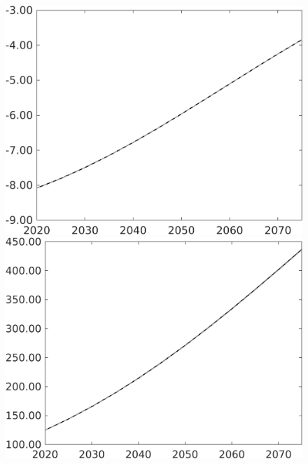 \documentclass[12pt]{article}
\begin{document}
\begin{figure}[h!!]
\begin{minipage}[]{0.32\textwidth}
\end{minipage}
\begin{minipage}[]{0.32\textwidth}
\includegraphics[width=1\textwidth]{../../codding_model/own_basedOnFried/optimalPol_010922_revision/figures/all_13Sept22/PerdifNoTauf_Equlab_regime0_CompTaul_N_spillover0_nsk0_xgr1_knspil1_sep1_LFlimit0_emsbase0_countec0_GovRev0_etaa0.79_lgd0.png}
\end{minipage}	
\begin{minipage}[]{0.32\textwidth}
\includegraphics[width=1\textwidth]{../../codding_model/own_basedOnFried/optimalPol_010922_revision/figures/all_13Sept22/PerdifNoTauf_Equlab_regime0_CompTaul_pepn_spillover0_nsk0_xgr1_knspil1_sep1_LFlimit0_emsbase0_countec0_GovRev0_etaa0.79_lgd0.png}

\end{minipage}
\end{figure}
\end{document}
